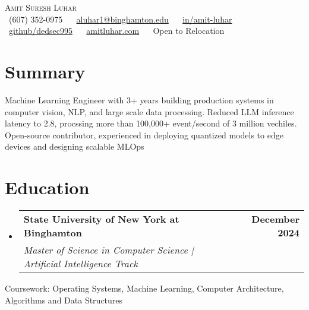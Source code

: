 \documentclass[letterpaper,8pt]{article}
\makeatletter
\newcommand{\resumeSubheading}[4]{
  \vspace{-2pt}\item
    \begin{tabular*}{1.0\textwidth}[t]{l@{\extracolsep{\fill}}r}
      \textbf{#1} & \textbf{\small #2} \\
      \textit{\small#3} & \textit{\small #4} \\
    \end{tabular*}\vspace{-7pt}
}
\newcommand{\resumeSubHeadingListStart}{\begin{itemize}[leftmargin=0.0in, label={}]}
\newcommand{\resumeSubHeadingListEnd}{\end{itemize}}\vspace{0pt}
\makeatother
\begin{document}

\begin{center}
    {\huge \scshape Amit Suresh Luhar} \\[2mm]
    \small \raisebox{-0.1\height}
    \faPhone\ (607) 352-0975 ~ 
    {\faEnvelope\  \href{mailto:aluhar1@binghamton.edu}{aluhar1@binghamton.edu}} ~ 
    {\faLinkedin\ \href{https://www.linkedin.com/in/amit-luhar/}{in/amit-luhar}}  ~
    {\faGithub\ \href{https://github.com/dedsec995}{github/dedsec995}} ~
    {\faBriefcase\ \href{https://amitluhar.com/}{amitluhar.com}} ~
    {\faGlobe\ {Open to Relocation}}
    \vspace{-5pt}
\end{center}

\section{Summary}
  Machine Learning Engineer with 3+ years building production systems in computer vision, NLP, and large scale data processing. Reduced LLM inference latency to 2.8, procssing more than 100,000+ event/second of 3 million vechiles. Open-source contributor, experienced in deploying quantized models to edge devices and designing scalable MLOps
\vspace{-6pt}

\section{Education}
  \resumeSubHeadingListStart
    \resumeSubheading
    {State University of New York at Binghamton}{December 2024}
    {Master of Science in Computer Science | Artificial Intelligence Track}{}
  \resumeSubHeadingListEnd
  \vspace{-4pt}
  Coursework: Operating Systems, Machine Learning, Computer Architecture, Algorithms and Data Structures \vspace{-4pt}
  \vspace{-4pt}

\end{document}

